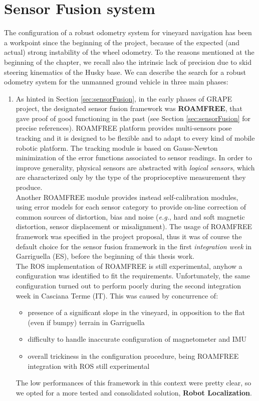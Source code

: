 \section{Sensor Fusion system}\label{sec:odometrySystem}

The configuration of a robust odometry system for vineyard navigation has been a workpoint since the beginning of the project, because of the expected (and actual) strong instability of the wheel odometry. To the reasons mentioned at the beginning of the chapter, we recall also the intrinsic lack of precision due to skid steering kinematics of the Husky base.
We can describe the search for a robust odometry system for the unmanned ground vehicle in three main phases:
\begin{enumerate}
	\item As hinted in Section \ref{sec:sensorFusion}, in the early phases of \ac{GRAPE} project, the designated sensor fusion framework was \textbf{ROAMFREE}, that gave proof of good functioning in the past (see Section \ref{sec:sensorFusion} for precise references). ROAMFREE platform provides multi-sensors pose tracking and it is designed to be flexible and to adapt to every kind of mobile robotic platform. The tracking module is based on Gauss-Newton minimization of the error functions associated to sensor readings. In order to improve generality, physical sensors are abstracted with \textit{logical sensors}, which are characterized only by the type of the proprioceptive measurement they produce. 
	\\ Another ROAMFREE module provides instead self-calibration modules, using error models for each sensor category to provide on-line correction of common sources of distortion, bias and noise (\textit{e.g.}, hard and soft magnetic distortion, sensor displacement or misalignment). The usage of ROAMFREE framework was specified in the project proposal, thus it was of course the default choice for the sensor fusion framework in the first \textit{integration week} in Garriguella (ES), before the beginning of this thesis work. 
	\\The \ac{ROS} implementation of ROAMFREE is still experimental, anyhow a configuration was identified to fit the requirements. Unfortunately, the same configuration turned out to perform poorly during the second integration week in Casciana Terme (IT). This was caused by concurrence of:
	\begin{itemize}
		\item presence of a significant slope in the vineyard, in opposition to the flat (even if bumpy) terrain in Garriguella
		\item difficulty to handle inaccurate configuration of magnetometer and \ac{IMU}
		\item overall trickiness in the configuration procedure, being ROAMFREE integration with \ac{ROS} still experimental
	\end{itemize}
	The low performances of this framework in this context were pretty clear, so we opted for a more tested and consolidated solution, \textbf{Robot Localization}.
	

\end{enumerate}
